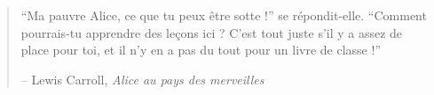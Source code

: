 
\newpage \vspace*{8cm}
\thispagestyle{empty}
\begin{quotation}
\begin{center}
  \large
  \enquote{Ma pauvre Alice, ce que tu peux être sotte !} se répondit-elle.
  \enquote{Comment pourrais-tu apprendre des leçons ici ? C’est tout juste s’il
  y a assez de place pour toi, et il n’y en a pas du tout pour un livre de classe !}
\end{center}
\begin{flushright} -- Lewis Carroll, \textit{Alice au pays des merveilles}\end{flushright}
\end{quotation}
